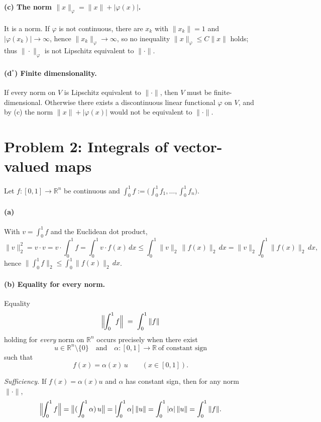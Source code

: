 \documentclass[12pt,a4paper]{article}
\theoremstyle{plain}
\theoremstyle{definition}
\theoremstyle{remark}
\theoremstyle{remark}
\begin{document}
	\paragraph{(c) The norm $\|x\|_\varphi=\|x\|+|\varphi(x)|$.}
	It is a norm. If $\varphi$ is not continuous, there are $x_k$ with $\|x_k\|=1$ and
	$|\varphi(x_k)|\to\infty$, hence $\|x_k\|_\varphi\to\infty$, so no inequality
	$\|x\|_\varphi\le C\|x\|$ holds; thus $\|\cdot\|_\varphi$ is not Lipschitz equivalent to $\|\cdot\|$.
	
	\paragraph{(d$^\ast$) Finite dimensionality.}
	If every norm on $V$ is Lipschitz equivalent to $\|\cdot\|$, then $V$ must be finite-dimensional.
	Otherwise there exists a discontinuous linear functional $\varphi$ on $V$, and by (c) the norm
	$\|x\|+|\varphi(x)|$ would not be equivalent to $\|\cdot\|$.
	
	\bigskip
	\section*{Problem 2: Integrals of vector-valued maps}
	
	
	
	Let $f:[0,1]\to\mathbb R^n$ be continuous and $\displaystyle \int_0^1 f:=\big(\int_0^1 f_1,\dots,\int_0^1 f_n\big)$.
	
	\paragraph{(a)}
	With $v=\int_0^1 f$ and the Euclidean dot product,
	\[
	\|v\|_2^2=v\cdot v=v\cdot \int_0^1 f=\int_0^1 v\cdot f(x)\,dx
	\le \int_0^1 \|v\|_2\,\|f(x)\|_2\,dx
	=\|v\|_2\int_0^1 \|f(x)\|_2\,dx,
	\]
	hence $\Big\|\int_0^1 f\Big\|_2 \le \int_0^1 \|f(x)\|_2\,dx$.
	
\paragraph{(b) Equality for every norm.}
Equality
\[
\Bigl\|\!\int_{0}^{1} f \Bigr\| \;=\; \int_{0}^{1} \|f\|
\]
holding for \emph{every} norm on $\mathbb{R}^n$ occurs precisely when there exist
\[
u\in\mathbb{R}^n\setminus\{0\}
\quad\text{and}\quad
\alpha:[0,1]\to\mathbb{R}\ \text{of constant sign}
\]
such that
\[
f(x)=\alpha(x)\,u \qquad (x\in[0,1]).
\]

\noindent\textit{Sufficiency.}
If $f(x)=\alpha(x)u$ and $\alpha$ has constant sign, then for any norm $\|\cdot\|$,
\[
\Bigl\|\!\int_{0}^{1} f \Bigr\|
=\bigl\| (\int_{0}^{1}\alpha)\,u \bigr\|
= \bigl|\!\int_{0}^{1}\alpha \bigr|\,\|u\|
= \int_{0}^{1} |\alpha|\,\|u\|
= \int_{0}^{1} \|f\|.
\]
\end{document}
